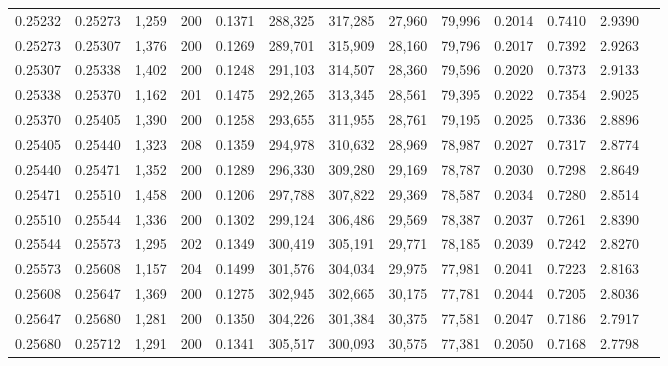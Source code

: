 \begin{tabular}{rrrrrrrrrrrrr}
0.25232 & 0.25273 & 1,259 & 200 &                                     0.1371 & 288,325 & 317,285 &  27,960 &  79,996 & 0.2014 & 0.7410 & 2.9390 \\
0.25273 & 0.25307 & 1,376 & 200 &                                     0.1269 & 289,701 & 315,909 &  28,160 &  79,796 & 0.2017 & 0.7392 & 2.9263 \\
0.25307 & 0.25338 & 1,402 & 200 &                                     0.1248 & 291,103 & 314,507 &  28,360 &  79,596 & 0.2020 & 0.7373 & 2.9133 \\
0.25338 & 0.25370 & 1,162 & 201 &                                     0.1475 & 292,265 & 313,345 &  28,561 &  79,395 & 0.2022 & 0.7354 & 2.9025 \\
0.25370 & 0.25405 & 1,390 & 200 &                                     0.1258 & 293,655 & 311,955 &  28,761 &  79,195 & 0.2025 & 0.7336 & 2.8896 \\
0.25405 & 0.25440 & 1,323 & 208 &                                     0.1359 & 294,978 & 310,632 &  28,969 &  78,987 & 0.2027 & 0.7317 & 2.8774 \\
0.25440 & 0.25471 & 1,352 & 200 &                                     0.1289 & 296,330 & 309,280 &  29,169 &  78,787 & 0.2030 & 0.7298 & 2.8649 \\
0.25471 & 0.25510 & 1,458 & 200 &                                     0.1206 & 297,788 & 307,822 &  29,369 &  78,587 & 0.2034 & 0.7280 & 2.8514 \\
0.25510 & 0.25544 & 1,336 & 200 &                                     0.1302 & 299,124 & 306,486 &  29,569 &  78,387 & 0.2037 & 0.7261 & 2.8390 \\
0.25544 & 0.25573 & 1,295 & 202 &                                     0.1349 & 300,419 & 305,191 &  29,771 &  78,185 & 0.2039 & 0.7242 & 2.8270 \\
0.25573 & 0.25608 & 1,157 & 204 &                                     0.1499 & 301,576 & 304,034 &  29,975 &  77,981 & 0.2041 & 0.7223 & 2.8163 \\
0.25608 & 0.25647 & 1,369 & 200 &                                     0.1275 & 302,945 & 302,665 &  30,175 &  77,781 & 0.2044 & 0.7205 & 2.8036 \\
0.25647 & 0.25680 & 1,281 & 200 &                                     0.1350 & 304,226 & 301,384 &  30,375 &  77,581 & 0.2047 & 0.7186 & 2.7917 \\
0.25680 & 0.25712 & 1,291 & 200 &                                     0.1341 & 305,517 & 300,093 &  30,575 &  77,381 & 0.2050 & 0.7168 & 2.7798 \\

\end{tabular}
